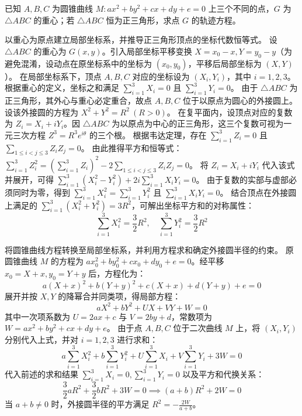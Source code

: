 \begin{example}
已知 $A, B, C$ 为圆锥曲线 $M: ax^2 + by^2 + cx + dy + e = 0$ 上三个不同的点，$G$ 为 $\triangle ABC$ 的重心；若 $\triangle ABC$ 恒为正三角形，求点 $G$ 的轨迹方程。
\end{example}
\begin{solution}
以重心为原点建立局部坐标系，并推导正三角形顶点的坐标代数恒等式。
设 $\triangle ABC$ 的重心为 $G(x, y)$。引入局部坐标平移变换 $X = x_0 - x, Y = y_0 - y$（为避免混淆，设动点在原坐标系中的坐标为 $(x_0, y_0)$，平移后局部坐标为 $(X, Y)$）。
在局部坐标系下，顶点 $A, B, C$ 对应的坐标设为 $(X_i, Y_i)$，其中 $i=1,2,3$。根据重心的定义，坐标之和满足 $\sum_{i=1}^3 X_i = 0$ 且 $\sum_{i=1}^3 Y_i = 0$。
由于 $\triangle ABC$ 为正三角形，其外心与重心必定重合，故点 $A, B, C$ 位于以原点为圆心的外接圆上。设该外接圆的方程为 $X^2 + Y^2 = R^2\ (R>0)$。
在复平面内，设顶点对应的复数为 $Z_i = X_i + iY_i$。因 $\triangle ABC$ 为以原点为中心的正三角形，这三个复数可视为一元三次方程 $Z^3 = R^3 e^{i\theta}$ 的三个根。
根据韦达定理，存在 $\sum_{i=1}^3 Z_i = 0$ 且 $\sum_{1 \le i < j \le 3} Z_i Z_j = 0$。
由此推得平方和恒等式：$\sum_{i=1}^3 Z_i^2 = \left(\sum_{i=1}^3 Z_i\right)^2 - 2\sum_{1 \le i < j \le 3} Z_i Z_j = 0$。
将 $Z_i = X_i + iY_i$ 代入该式并展开，可得 $\sum_{i=1}^3 (X_i^2 - Y_i^2) + 2i \sum_{i=1}^3 X_i Y_i = 0$。
由于复数的实部与虚部必须同时为零，得到 $\sum_{i=1}^3 X_i^2 = \sum_{i=1}^3 Y_i^2$ 且 $\sum_{i=1}^3 X_i Y_i = 0$。
结合顶点在外接圆上满足的 $\sum_{i=1}^3 (X_i^2 + Y_i^2) = 3R^2$，可解出坐标平方和的对称属性：
$$ \sum_{i=1}^3 X_i^2 = \frac{3}{2}R^2, \quad \sum_{i=1}^3 Y_i^2 = \frac{3}{2}R^2 $$

将圆锥曲线方程转换至局部坐标系，并利用方程求和确定外接圆半径的约束。
原圆锥曲线 $M$ 的方程为 $ax_0^2 + by_0^2 + cx_0 + dy_0 + e = 0$。经平移 $x_0 = X+x, y_0 = Y+y$ 后，方程化为：
$$ a(X+x)^2 + b(Y+y)^2 + c(X+x) + d(Y+y) + e = 0 $$
展开并按 $X, Y$ 的降幂合并同类项，得局部方程：
$$ aX^2 + bY^2 + UX + VY + W = 0 $$
其中一次项系数为 $U = 2ax + c$ 与 $V = 2by + d$，常数项为 $W = ax^2 + by^2 + cx + dy + e$。
由于点 $A, B, C$ 位于二次曲线 $M$ 上，将 $(X_i, Y_i)$ 分别代入上式，并对 $i=1,2,3$ 进行求和：
$$ a \sum_{i=1}^3 X_i^2 + b \sum_{i=1}^3 Y_i^2 + U \sum_{i=1}^3 X_i + V \sum_{i=1}^3 Y_i + 3W = 0 $$
代入前述的求和结果 $\sum_{i=1}^3 X_i = 0, \sum_{i=1}^3 Y_i = 0$ 以及平方和代换关系：
$$ \frac{3}{2}aR^2 + \frac{3}{2}bR^2 + 3W = 0 \implies (a+b)R^2 + 2W = 0 $$
当 $a+b \neq 0$ 时，外接圆半径的平方满足 $R^2 = -\frac{2W}{a+b}$。


\end{solution}
